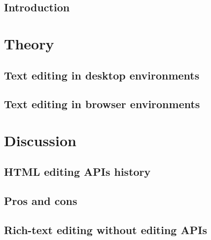 \chapter{Introduction}



\part{Theory}
\label{part:theory}

\chapter{Text editing in desktop environments}
\label{ch:desktop}



\chapter{Text editing in browser environments}
\label{ch:browser}






\part{Discussion}
\label{part:discussion}



\chapter{HTML editing APIs history}
\label{ch:editing_apis_history}






\chapter{Pros and cons}





\chapter{Rich-text editing without editing APIs}

